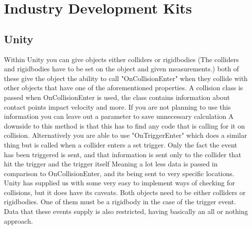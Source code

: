 \documentclass{scrartcl}
\begin{document}
	
	\section{Industry Development Kits}
	\subsection{Unity}
	Within Unity you can give objects either colliders or rigidbodies (The colliders and rigidbodies have to be set on the object and given measurements.) both of these give the object the ability to call "OnCollisionEnter" when they collide with other objects that have one of the aforementioned properties. A collision class is passed when OnCollisionEnter is used, the class contains information about contact points impact velocity and more. If you are not planning to use this information you can leave out a parameter to save unnecessary calculation\cite{UnityCollision} A downside to this method is that this has to find any code that is calling for it on collision. Alternatively you are able to use "OnTriggerEnter" which does a similar thing but is called when a collider enters a set trigger. Only the fact the event has been triggered is sent, and that information is sent only to the collider that hit the trigger and the trigger itself\cite{UnityTrigger} Meaning a lot less data is passed in comparison to OnCollisionEnter, and its being sent to very specific locations. Unity has supplied us with some very easy to implement ways of checking for collisions, but it does have its caveats. Both objects need to be either colliders or rigidbodies. One of them must be a rigidbody in the case of the trigger event. Data that these events supply is also restricted, having basically an all or nothing approach.
	
\end{document}
